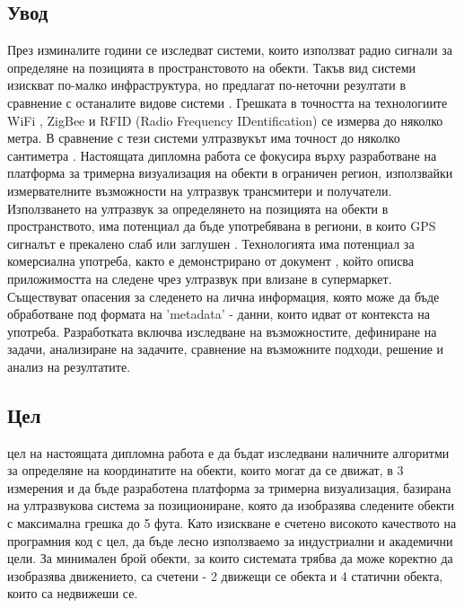 \subsection{Увод}
\tab През изминалите години се изследват системи, които използват радио сигнали за определяне на позицията в пространстовото на обекти. Такъв вид системи изискват по-малко инфраструктура, но предлагат по-неточни резултати в сравнение с останалите видове системи \cite{CarlosMedina}. Грешката в точността на технологиите WiFi \cite{wifi}, ZigBee \cite{zigbee} и RFID (Radio Frequency IDentification) \cite{rfid} се измерва до няколко метра. В сравнение с тези системи ултразвукът има точност до няколко сантиметра \cite{CarlosMedina} \cite{columbia}. Настоящата дипломна работа се фокусира върху разработване на платформа за тримерна визуализация на обекти в ограничен регион, използвайки измервателните възможности на ултразвук трансмитери и получатели. Използването на ултразвук за определянето на позицията на обекти в пространството, има потенциал да бъде употребявана в региони, в които GPS сигналът е прекалено слаб или заглушен \cite{yonei}. Технологията има потенциал за комерсиална употреба, както е демонстрирано от документ \cite{batmobile}, който описва приложимостта на следене чрез ултразвук при влизане в супермаркет. Съществуват опасения за следенето на лична информация, която може да бъде обработване под формата на 'metadata' - данни, които идват от контекста на употреба. Разработката включва изследване на възможностите, дефиниране на задачи, анализиране на задачите, сравнение на възможните подходи, решение и анализ на резултатите. 

\subsection{Цел}
 цел на настоящата дипломна работа е да бъдат изследвани наличните алгоритми за определяне на координатите на обекти, които могат да се движат, в 3 измерения и да бъде разработена платформа за тримерна визуализация, базирана на ултразвукова система за позициониране, която да изобразява следените обекти с максимална грешка до 5 фута. Като изискване е счетено високото качеството на програмния код с цел, да бъде лесно използваемо за индустриални и академични цели. За минимален брой обекти, за които системата трябва да може коректно да изобразява движението, са счетени - 2 движещи се обекта и 4 статични обекта, които са недвижеши се.

